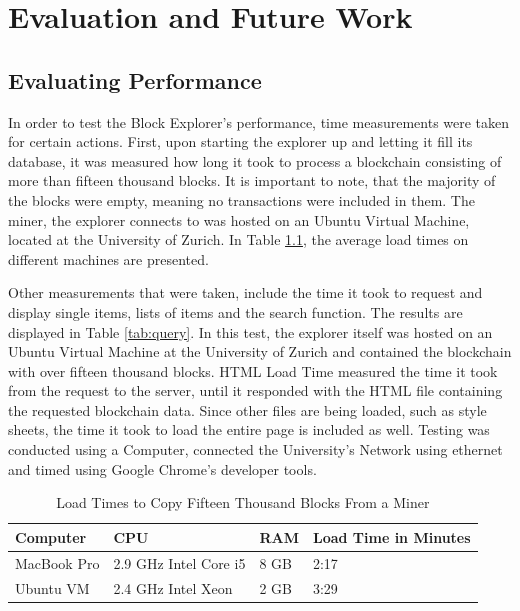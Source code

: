 \chapter{Evaluation and Future Work}
\section{Evaluating Performance}

In order to test the Block Explorer's performance, time measurements were taken for certain actions. First, upon starting the explorer up and letting it fill its database, it was measured how long it took to process a blockchain consisting of more than fifteen thousand blocks. It is important to note, that the majority of the blocks were empty, meaning no transactions were included in them. The miner, the explorer connects to was hosted on an Ubuntu \cite{ubuntu} Virtual Machine, located at the University of Zurich. In Table \ref{tab:load}, the average load times on different machines are presented.

Other measurements that were taken, include the time it took to request and display single items, lists of items and the search function. The results are displayed in Table \ref{tab:query}. In this test, the explorer itself was hosted on an Ubuntu Virtual Machine at the University of Zurich and contained the blockchain with over fifteen thousand blocks. HTML Load Time measured the time it took from the request to the server, until it responded with the HTML file containing the requested blockchain data. Since other files are being loaded, such as style sheets, the time it took to load the entire page is included as well. Testing was conducted using a Computer, connected the University's Network using ethernet and timed using Google Chrome's \cite{chrome} developer tools.

\begin{table}[]
\centering
\caption{Load Times to Copy Fifteen Thousand Blocks From a Miner}
\label{tab:load}
\begin{tabular}{|l|l|l|l|}
\hline
\textbf{Computer} & \textbf{CPU} & \textbf{RAM} & \textbf{Load Time in Minutes} \\ \hline
MacBook Pro & 2.9 GHz Intel Core i5 & 8 GB & 2:17 \\ \hline
Ubuntu VM & 2.4 GHz  Intel Xeon & 2 GB  & 3:29 \\ \hline
\end{tabular}
\end{table}

